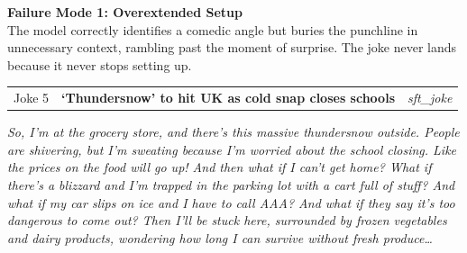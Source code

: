 \documentclass[11pt]{article}
\begin{document}
\newcommand{\failureentry}[5]{%
\begin{tcolorbox}[
  enhanced, breakable,
  width=\columnwidth,
  colback=white,
  colframe=black!12,
  arc=3pt, boxrule=0.4pt,
  left=0pt, right=0pt, top=0pt, bottom=3pt,
  after skip=5pt, before skip=2pt
]
  \begin{tcolorbox}[
    enhanced, breakable,
    width=\columnwidth,
    colback=#1, colframe=#1,
    arc=2pt, sharp corners=south, boxrule=0pt,
    left=6pt, right=6pt, top=3pt, bottom=3pt
  ]
  \begin{tabularx}{\linewidth}{@{}l@{\hspace{6pt}}X@{\hspace{6pt}}l@{}}
    {\scriptsize\ttfamily\color{white!50} #2} &
    {\scriptsize\sffamily\bfseries\color{white} #3} &
    {\scriptsize\sffamily\color{white!60}\itshape #4}
  \end{tabularx}
  \end{tcolorbox}
  \vspace{2pt}
  \begin{tcolorbox}[
    enhanced, breakable,
    width=\columnwidth,
    colback=#1!6,
    colframe=#1!28,
    leftrule=3pt, rightrule=0.4pt, toprule=0.4pt, bottomrule=0.4pt,
    arc=2pt, left=6pt, right=6pt, top=3pt, bottom=3pt
  ]
  {\sffamily\scriptsize\itshape\color{black!80} #5}
  \end{tcolorbox}
\end{tcolorbox}%
}

\begin{tcolorbox}[
  enhanced, breakable,
  width=\columnwidth,
  colback=failredbg,
  colframe=failred!40,
  leftrule=4pt, rightrule=0.4pt, toprule=0.4pt, bottomrule=0.4pt,
  arc=3pt,
  left=6pt, right=6pt, top=4pt, bottom=4pt,
  after skip=6pt
]
{\sffamily\small\bfseries\color{failred} Failure Mode 1: Overextended Setup}\\[2pt]
{\sffamily\small\color{black!75} The model correctly identifies a comedic angle but buries the punchline in unnecessary context, rambling past the moment of surprise. The joke never lands because it never stops setting up.}
\end{tcolorbox}

\failureentry{failred}{Joke 5}{`Thundersnow' to hit UK as cold snap closes schools}{sft\_joke}{So, I'm at the grocery store, and there's this massive thundersnow outside. People are shivering, but I'm sweating because I'm worried about the school closing. Like the prices on the food will go up! And then what if I can't get home? What if there's a blizzard and I'm trapped in the parking lot with a cart full of stuff? And what if my car slips on ice and I have to call AAA? And what if they say it's too dangerous to come out? Then I'll be stuck here, surrounded by frozen vegetables and dairy products, wondering how long I can survive without fresh produce\ldots}
\end{document}
